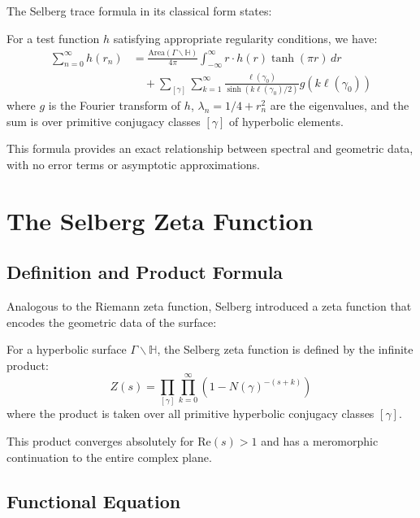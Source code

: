 The Selberg trace formula in its classical form states:

\begin{theorem}
\label{thm:selberg_trace}
For a test function $h$ satisfying appropriate regularity conditions, we have:
\begin{align}
\sum_{n=0}^{\infty} h(r_n) &= \frac{\text{Area}(\Gamma \backslash \mathbb{H})}{4\pi} \int_{-\infty}^{\infty} r \cdot h(r) \tanh(\pi r) \, dr \\
&\quad + \sum_{[\gamma]} \sum_{k=1}^{\infty} \frac{\ell(\gamma_0)}{\sinh(k\ell(\gamma_0)/2)} g(k\ell(\gamma_0))
\end{align}
where $g$ is the Fourier transform of $h$, $\lambda_n = 1/4 + r_n^2$ are the eigenvalues, and the sum is over primitive conjugacy classes $[\gamma]$ of hyperbolic elements.
\end{theorem}

This formula provides an exact relationship between spectral and geometric data, with no error terms or asymptotic approximations.

\section{The Selberg Zeta Function}
\label{sec:selberg_zeta}

\subsection{Definition and Product Formula}

Analogous to the Riemann zeta function, Selberg introduced a zeta function that encodes the geometric data of the surface:

\begin{definition}
\label{def:selberg_zeta}
For a hyperbolic surface $\Gamma \backslash \mathbb{H}$, the Selberg zeta function is defined by the infinite product:
$$Z(s) = \prod_{[\gamma]} \prod_{k=0}^{\infty} \left(1 - N(\gamma)^{-(s+k)}\right)$$
where the product is taken over all primitive hyperbolic conjugacy classes $[\gamma]$.
\end{definition}

This product converges absolutely for $\text{Re}(s) > 1$ and has a meromorphic continuation to the entire complex plane.

\subsection{Functional Equation}

